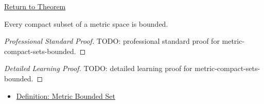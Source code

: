 \newpage
{}
\label{prf:metric-compact-sets-bounded}

\begin{remark*}[Return]
\hyperref[thm:metric-compact-sets-bounded]{Return to Theorem}
\end{remark*}

\begin{theorem*}
Every compact subset of a metric space is bounded.
\end{theorem*}

\begin{proof}[Professional Standard Proof]
\LRAProofBodyStart
TODO: professional standard proof for metric-compact-sets-bounded.
\end{proof}

\begin{proof}[Detailed Learning Proof]
\LRAProofBodyStart
TODO: detailed learning proof for metric-compact-sets-bounded.
\end{proof}

\begin{remark*}
\end{remark*}

\begin{dependencies}
\begin{itemize}
  \item \hyperref[def:metric-bounded-set]{Definition: Metric Bounded Set}
\end{itemize}
\end{dependencies}

\clearpage
